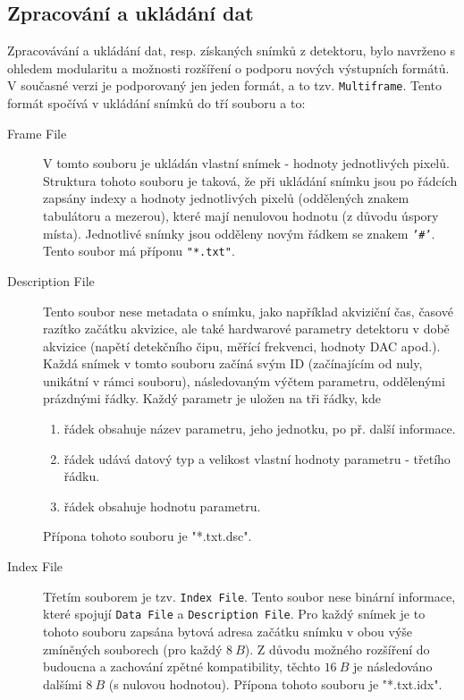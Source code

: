 \subsection{Zpracování a ukládání dat}\label{atlas:cont:output}
Zpracovávání a ukládání dat, resp. získaných snímků z detektoru, bylo navrženo s ohledem modularitu a možnosti rozšíření o podporu nových výstupních formátů. V současné verzi je podporovaný jen jeden formát, a to tzv. \texttt{Multiframe}. Tento formát spočívá v ukládání snímků do tří souboru a to:
\begin{description}
	\item[Frame File] V tomto souboru je ukládán vlastní snímek - hodnoty jednotlivých pixelů. Struktura tohoto souboru je taková, že při ukládání snímku jsou po řádcích zapsány indexy a hodnoty jednotlivých pixelů (oddělených znakem tabulátoru a mezerou), které mají nenulovou hodnotu (z důvodu úspory místa). Jednotlivé snímky jsou odděleny novým řádkem se znakem \texttt{'\#'}. Tento soubor má příponu \texttt{"*.txt"}.
	\item[Description File] Tento soubor nese metadata o snímku, jako například akviziční čas, časové razítko začátku akvizice, ale také hardwarové parametry detektoru v době akvizice (napětí detekčního čipu, měřící frekvenci, hodnoty DAC apod.). Každá snímek v tomto souboru začíná svým ID (začínajícím od nuly, unikátní v rámci souboru), následovaným výčtem parametru, oddělenými prázdnými řádky. Každý parametr je uložen na tři řádky, kde
		\begin{enumerate}
			\item řádek obsahuje název parametru, jeho jednotku, po př. další informace.
			\item řádek udává datový typ a velikost vlastní hodnoty parametru - třetího řádku.
			\item řádek obsahuje hodnotu parametru.
		\end{enumerate}
	Přípona tohoto souboru je "*.txt.dsc".
	\item[Index File] Třetím souborem je tzv. \texttt{Index File}. Tento soubor nese binární informace, které spojují \texttt{Data File} a \texttt{Description File}. Pro každý snímek je to tohoto souboru zapsána bytová adresa začátku snímku v obou výše zmíněných souborech (pro každý $8~B$). Z důvodu možného rozšíření do budoucna a zachování zpětné kompatibility, těchto $16~B$ je následováno dalšími $8~B$ (s nulovou hodnotou). Přípona tohoto souboru je "*.txt.idx".
\end{description}

